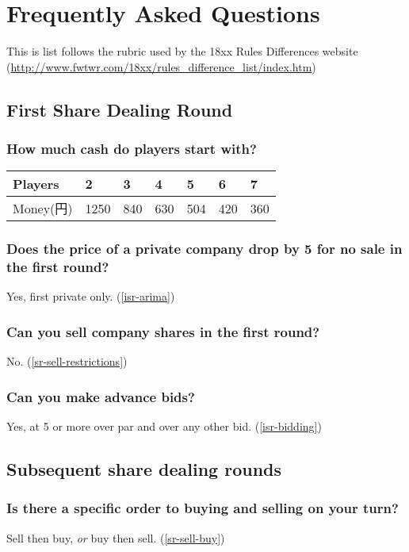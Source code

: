 \section{Frequently Asked Questions}
This is list follows the rubric used by the 18xx Rules Differences
website
(\url{http://www.fwtwr.com/18xx/rules_difference_list/index.htm})

\renewcommand*{\thesubsection}{\arabic{subsection}}

\subsection{First Share Dealing Round}

\subsubsection{How much cash do players start with?}
\begin{tabular}{l|llllll}
Players & 2 & 3 & 4 & 5 & 6 & 7 \\ \hline
Money(円) & 1250 & 840 & 630 & 504 & 420 & 360
\end{tabular}

\subsubsection{Does the price of a private company drop by 5 for no
  sale in the first round?}
Yes, first private only. (\autoref{isr-arima})

\subsubsection{Can you sell company shares in the first round?}
No. (\autoref{sr-sell-restrictions})

\subsubsection{Can you make advance bids?}
Yes, at 5 or more over par and over any other bid. (\autoref{isr-bidding})

\subsection{Subsequent share dealing rounds}

\subsubsection{Is there a specific order to buying and selling on your turn?}
Sell then buy, \emph{or} buy then sell. (\autoref{sr-sell-buy})

